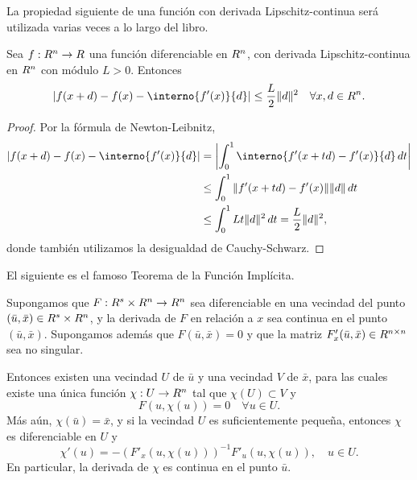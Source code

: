 La propiedad siguiente de una función con derivada Lipschitz-continua será utilizada varias veces a lo largo del libro.

\begin{lemma}\label{v2:lem:1.5.4}
    Sea $f : R^n \to R$ una función diferenciable en $R^n$, con derivada Lipschitz-continua en $R^n$ con módulo $L > 0$.
    Entonces
    \[
        |f(x+d) - f(x) - \interno{f'(x)}{d}| \le \frac{L}{2} \|d\|^2 \quad \forall x, d \in \Rn.
    \]
\end{lemma}

\begin{proof}
    Por la fórmula de Newton-Leibnitz,
    \begin{align*}
        |f(x+d) - f(x) - \interno{f'(x)}{d}| &= \left| \int_0^1 \interno{f'(x+td) - f'(x)}{d} \, dt \right| \\
        &\le \int_0^1 \|f'(x+td) - f'(x)\| \|d\| \, dt \\
        &\le \int_0^1 Lt\|d\|^2 \, dt = \frac{L}{2} \|d\|^2,
    \end{align*}
    donde también utilizamos la desigualdad de Cauchy-Schwarz.
\end{proof}

El siguiente es el famoso Teorema de la Función Implícita.

\begin{theorem}\label{v2:thm:1.5.3}
    Supongamos que $F : R^s \times R^n \to R^n$ sea diferenciable en una vecindad del punto $(\bar{u}, \bar{x}) \in R^s \times R^n$, y la derivada de $F$ en relación a $x$ sea continua en el punto $(\bar{u}, \bar{x})$. Supongamos además que $F(\bar{u}, \bar{x}) = 0$ y que la matriz $F'_x(\bar{u}, \bar{x}) \in R^{n \times n}$ sea no singular.
    
    Entonces existen una vecindad $U$ de $\bar{u}$ y una vecindad $V$ de $\bar{x}$, para las cuales existe una única función $\chi : U \to R^n$ tal que $\chi(U) \subset V$ y
    \begin{equation}
        F(u, \chi(u)) = 0 \quad \forall u \in U.
        \label{v2:eq:1.42}
    \end{equation}
    Más aún, $\chi(\bar{u}) = \bar{x}$, y si la vecindad $U$ es suficientemente pequeña, entonces $\chi$ es diferenciable en $U$ y
    \[
        \chi'(u) = -(F'_x(u, \chi(u)))^{-1} F'_u(u, \chi(u)), \quad u \in U.
    \]
    En particular, la derivada de $\chi$ es continua en el punto $\bar{u}$.
\end{theorem}


